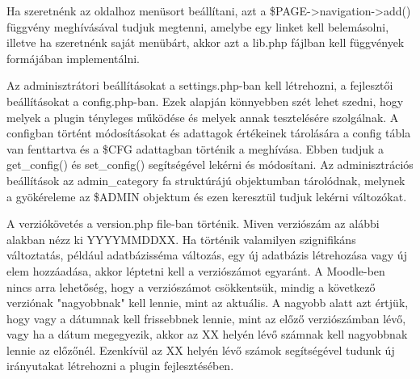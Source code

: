 Ha szeretnénk az oldalhoz menüsort beállítani, azt a \$PAGE->navigation->add() függvény meghívásával tudjuk megtenni, amelybe egy linket kell belemásolni, illetve ha szeretnénk saját menübárt, akkor azt a lib.php fájlban kell függvények formájában implementálni. \par

Az adminisztrátori beállításokat a settings.php-ban kell létrehozni, a fejlesztői beállításokat a config.php-ban. Ezek alapján könnyebben szét lehet szedni, hogy melyek a plugin tényleges működése és melyek annak tesztelésére szolgálnak. A configban történt módosításokat és adattagok értékeinek tárolására a config tábla van fenttartva és a \$CFG adattagban történik a meghívása. Ebben tudjuk a get\_config() és set\_config() segítségével lekérni és módosítani. Az adminisztrációs beállítások az admin\_category fa struktúrájú objektumban tárolódnak, melynek a gyökéreleme az \$ADMIN objektum és ezen keresztül tudjuk lekérni változókat. \par

A verziókövetés a version.php file-ban történik. Miven verziószám az alábbi alakban nézz ki YYYYMMDDXX. Ha történik valamilyen szignifikáns változtatás, például adatbázisséma változás, egy új adatbázis létrehozása vagy új elem hozzáadása, akkor léptetni kell a verziószámot egyaránt. A Moodle-ben nincs arra lehetőség, hogy a verziószámot csökkentsük, mindig a következő verziónak "nagyobbnak" kell lennie, mint az aktuális. A nagyobb alatt azt értjük, hogy vagy a dátumnak kell frissebbnek lennie, mint az előző verziószámban lévő, vagy ha a dátum megegyezik, akkor az XX helyén lévő számnak kell nagyobbnak lennie az előzőnél. Ezenkívül az XX helyén lévő számok segítségével tudunk új irányutakat létrehozni a plugin fejlesztésében. \par

